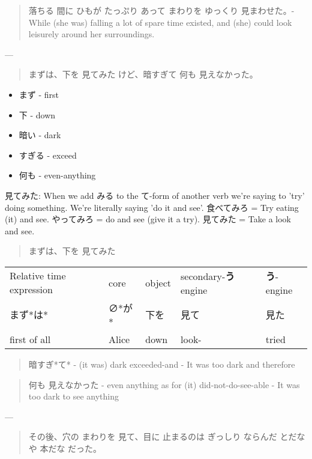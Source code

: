 \documentclass[11pt]{article}
\begin{document}
\begin{quote}
落ちる 間に ひもが たっぷり あって まわりを ゆっくり 見まわせた。- While (she was) falling a lot of spare time existed, and (she) could look leisurely around her surroundings.
\end{quote}

---

\begin{quote}
まずは、下を 見てみた けど、暗すぎて 何も 見えなかった。
\end{quote}
\begin{itemize}
\item まず - first
\item 下 - down
\item 暗い - dark
\item すぎる - exceed
\item 何も - even-anything
\end{itemize}

見てみた: When we add みる to the て-form of another verb we're saying to 'try' doing something. We're literally saying 'do it and see'. 食べてみろ = Try eating (it) and see. やってみろ = do and see (give it a try). 見てみた = Take a look and see.

\begin{quote}
まずは、下を 見てみた
\end{quote}
\begin{center}
\begin{tabular}{lllll}
Relative time expression & core & object & secondary-\textbf{う} engine & \textbf{う}-engine\\
まず*は* & ∅*が* & 下を & 見て & 見た\\
first of all & Alice & down & look- & tried\\
\end{tabular}
\end{center}

\begin{quote}
暗すぎ*て* - (it was) dark exceeded-and - It was too dark and therefore
\end{quote}

\begin{quote}
何も 見えなかった - even anything as for (it) did-not-do-see-able - It was too dark to see anything
\end{quote}

---

\begin{quote}
その後、穴の まわりを 見て、目に 止まるのは ぎっしり ならんだ とだな や 本だな だった。
\end{quote}
\end{document}
